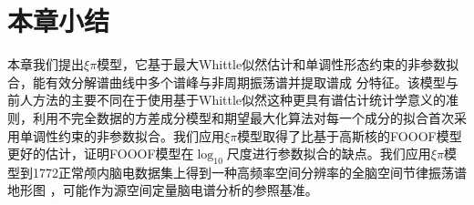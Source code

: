 
\section{本章小结}
本章我们提出$\xi\pi$模型，它基于最大Whittle似然估计和单调性形态约束的非参数拟合，能有效分解谱曲线中多个谱峰与非周期振荡谱并提取谱成
分特征。该模型与前人方法的主要不同在于使用基于Whittle似然这种更具有谱估计统计学意义的准则，利用不完全数据的方差成分模型和期望最大化算法对每一个成分的拟合首次采用单调性约束的非参数拟合。我们应用$\xi\pi$模型取得了比基于高斯核的FOOOF模型更好的估计，证明FOOOF模型在$\log_{10}$尺度进行参数拟合的缺点。我们应用$\xi\pi$模型到1772正常颅内脑电数据集上得到一种高频率空间分辨率的全脑空间节律振荡谱地形图
，可能作为源空间定量脑电谱分析的参照基准。